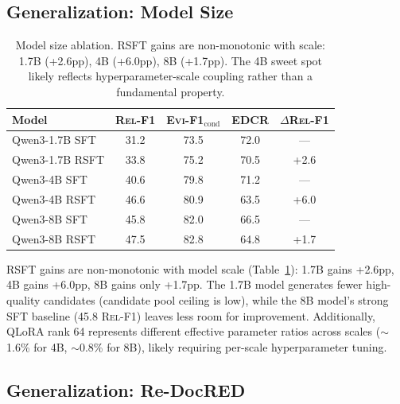 \documentclass[11pt,a4paper]{article}
\newcommand{\evi}{\textsc{Evi-F1}}
\newcommand{\edcr}{\textsc{EDCR}}
\newcommand{\relf}{\textsc{Rel-F1}}
\begin{document}
\subsection{Generalization: Model Size}
\label{sec:model_size}

\begin{table}[t]
\centering
\small
\begin{tabular}{lcccc}
\toprule
\textbf{Model} & \textbf{\relf{}} & \textbf{\evi{}$_\text{cond}$} & \textbf{\edcr{}} & \textbf{$\Delta$\relf{}} \\
\midrule
Qwen3-1.7B SFT & 31.2 & 73.5 & 72.0 & --- \\
Qwen3-1.7B RSFT & 33.8 & 75.2 & 70.5 & +2.6 \\
\midrule
Qwen3-4B SFT & 40.6 & 79.8 & 71.2 & --- \\
Qwen3-4B RSFT & 46.6 & 80.9 & 63.5 & +6.0 \\
\midrule
Qwen3-8B SFT & 45.8 & 82.0 & 66.5 & --- \\
Qwen3-8B RSFT & 47.5 & 82.8 & 64.8 & +1.7 \\
\bottomrule
\end{tabular}
\caption{Model size ablation. RSFT gains are non-monotonic with scale: 1.7B (+2.6pp), 4B (+6.0pp), 8B (+1.7pp). The 4B sweet spot likely reflects hyperparameter-scale coupling rather than a fundamental property.}
\label{tab:model_size}
\end{table}

RSFT gains are non-monotonic with model scale (Table~\ref{tab:model_size}): 1.7B gains +2.6pp, 4B gains +6.0pp, 8B gains only +1.7pp. The 1.7B model generates fewer high-quality candidates (candidate pool ceiling is low), while the 8B model's strong SFT baseline (45.8 \relf{}) leaves less room for improvement. Additionally, QLoRA rank 64 represents different effective parameter ratios across scales ($\sim$1.6\% for 4B, $\sim$0.8\% for 8B), likely requiring per-scale hyperparameter tuning.

\subsection{Generalization: Re-DocRED}
\label{sec:redocred}
\end{document}
